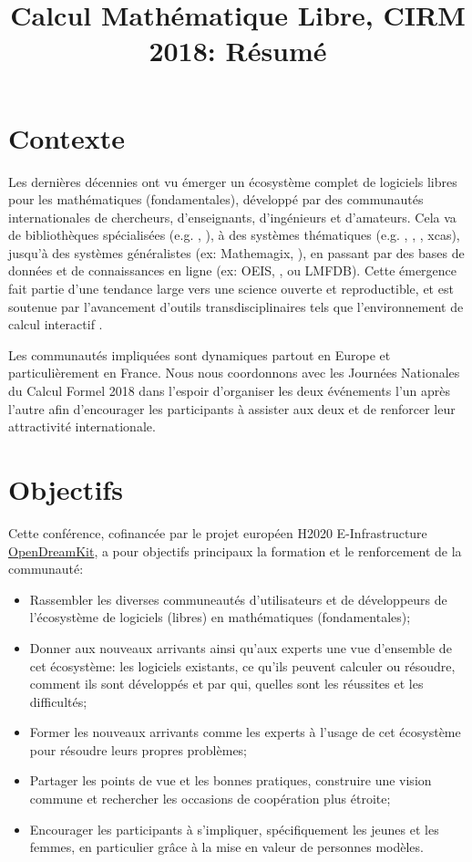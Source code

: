\documentclass[12pt]{amsart}
\begin{document}
\title{Calcul Mathématique Libre, CIRM 2018: Résumé}
\maketitle
\thispagestyle{empty}

\section*{Contexte}
Les dernières décennies ont vu émerger un écosystème complet de logiciels libres pour les mathématiques (fondamentales), développé par des communautés internationales de chercheurs, d'enseignants, d'ingénieurs et d'amateurs. Cela va de bibliothèques spécialisées (e.g. \MPIR, \Linbox), à des systèmes thématiques (e.g. \GAP, \Pari, \Singular, xcas), jusqu'à des systèmes généralistes (ex: Mathemagix, \Sage), en passant par des bases de données et de connaissances en ligne (ex: OEIS, \MathHub, ou LMFDB). Cette émergence fait partie d'une tendance large vers une science ouverte et reproductible,  et est soutenue par l'avancement d'outils transdisciplinaires tels que l'environnement de calcul interactif \Jupyter.

Les communautés impliquées sont dynamiques partout en Europe et particulièrement en France. Nous nous coordonnons avec les Journées Nationales du Calcul Formel 2018 dans l'espoir d'organiser les deux événements l'un après l'autre afin d'encourager les participants à assister aux deux et de renforcer leur attractivité internationale.

\section*{Objectifs}
Cette conférence, cofinancée par le projet européen H2020 E-Infrastructure \href{opendreamkit.org}{OpenDreamKit}, a pour objectifs principaux la formation et le renforcement de la communauté:
\begin{itemize}
\item Rassembler les diverses communeautés d'utilisateurs et de développeurs de l'écosystème de logiciels (libres) en mathématiques (fondamentales);
\item Donner aux nouveaux arrivants ainsi qu'aux experts une vue d'ensemble de cet écosystème: les logiciels existants, ce qu'ils peuvent calculer ou résoudre, comment ils sont développés et par qui, quelles sont les réussites et les difficultés;
\item Former les nouveaux arrivants comme les experts à l'usage de cet écosystème pour résoudre leurs propres problèmes;
\item Partager les points de vue et les bonnes pratiques, construire une vision commune et rechercher les occasions de coopération plus étroite;
\item Encourager les participants à s'impliquer, spécifiquement les jeunes et les femmes, en particulier grâce à la mise en valeur de personnes modèles.
\end{itemize}
\end{document}

